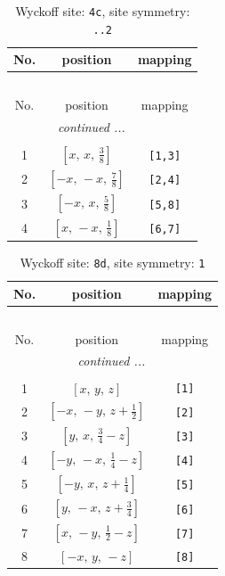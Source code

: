 \documentclass[fleqn,8pt]{jsarticle}
\begin{document}
\renewcommand{\arraystretch}{1.2}
\begin{longtable}{ccc}
\caption{Wyckoff site: {\tt 4c}, site symmetry: {\tt ..2}}
 \\
 \hline \hline
No. & position & mapping \\ \hline \endfirsthead

\multicolumn{2}{l}{\tablename\ \thetable{}} \\
 \hline \hline
No. & position & mapping \\ \hline \endhead

 \hline \hline
\multicolumn{2}{r}{\footnotesize\it continued ...} \\ \endfoot

 \hline \hline
\multicolumn{2}{r}{} \\ \endlastfoot

1 & $\left[ x,\, x,\, \frac{3}{8} \right]$ & {\tt [1,3]} \\ \hline
2 & $\left[ - x,\, - x,\, \frac{7}{8} \right]$ & {\tt [2,4]} \\ \hline
3 & $\left[ - x,\, x,\, \frac{5}{8} \right]$ & {\tt [5,8]} \\ \hline
4 & $\left[ x,\, - x,\, \frac{1}{8} \right]$ & {\tt [6,7]} \\
\end{longtable}
\renewcommand{\arraystretch}{1.2}
\begin{longtable}{ccc}
\caption{Wyckoff site: {\tt 8d}, site symmetry: {\tt 1}}
 \\
 \hline \hline
No. & position & mapping \\ \hline \endfirsthead

\multicolumn{2}{l}{\tablename\ \thetable{}} \\
 \hline \hline
No. & position & mapping \\ \hline \endhead

 \hline \hline
\multicolumn{2}{r}{\footnotesize\it continued ...} \\ \endfoot

 \hline \hline
\multicolumn{2}{r}{} \\ \endlastfoot

1 & $\left[ x,\, y,\, z \right]$ & {\tt [1]} \\ \hline
2 & $\left[ - x,\, - y,\, z + \frac{1}{2} \right]$ & {\tt [2]} \\ \hline
3 & $\left[ y,\, x,\, \frac{3}{4} - z \right]$ & {\tt [3]} \\ \hline
4 & $\left[ - y,\, - x,\, \frac{1}{4} - z \right]$ & {\tt [4]} \\ \hline
5 & $\left[ - y,\, x,\, z + \frac{1}{4} \right]$ & {\tt [5]} \\ \hline
6 & $\left[ y,\, - x,\, z + \frac{3}{4} \right]$ & {\tt [6]} \\ \hline
7 & $\left[ x,\, - y,\, \frac{1}{2} - z \right]$ & {\tt [7]} \\ \hline
8 & $\left[ - x,\, y,\, - z \right]$ & {\tt [8]} \\
\end{longtable}
\end{document}
